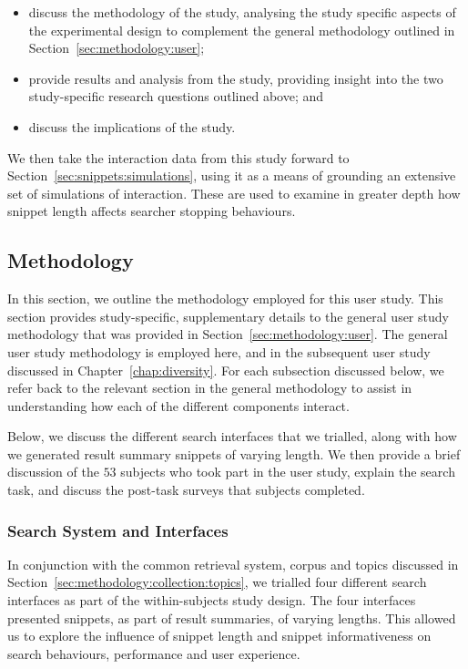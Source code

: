 \begin{itemize}
    \item{discuss the methodology of the study, analysing the study specific aspects of the experimental design to complement the general methodology outlined in Section~\ref{sec:methodology:user};}
    \item{provide results and analysis from the study, providing insight into the two study-specific research questions outlined above; and}
    \item{discuss the implications of the study.}
\end{itemize}

We then take the interaction data from this study forward to Section~\ref{sec:snippets:simulations}, using it as a means of grounding an extensive set of simulations of interaction. These are used to examine in greater depth how snippet length affects searcher stopping behaviours.

\subsection{Methodology}\label{sec:snippets:method}
In this section, we outline the methodology employed for this user study. This section provides study-specific, supplementary details to the general user study methodology that was provided in Section~\ref{sec:methodology:user}. The general user study methodology is employed here, and in the subsequent user study discussed in Chapter~\ref{chap:diversity}. For each subsection discussed below, we refer back to the relevant section in the general methodology to assist in understanding how each of the different components interact.

Below, we discuss the different search interfaces that we trialled, along with how we generated result summary snippets of varying length. We then provide a brief discussion of the $53$ subjects who took part in the user study, explain the search task, and discuss the post-task surveys that subjects completed.

\subsubsection{Search System and Interfaces}\label{sec:snippets:method:system}
In conjunction with the common retrieval system, corpus and topics discussed in Section~\ref{sec:methodology:collection:topics}, we trialled four different search interfaces as part of the within-subjects study design. The four interfaces presented snippets, as part of result summaries, of varying lengths. This allowed us to explore the influence of snippet length and snippet informativeness on search behaviours, performance and user experience.


